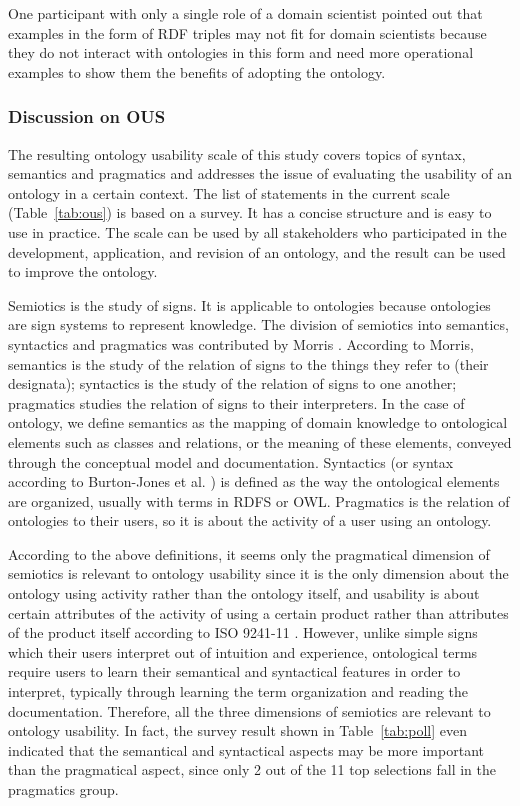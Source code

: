 One participant with only a single role of a domain scientist pointed out that examples in the form of RDF triples may not fit for domain scientists because they do not interact with ontologies in this form and need more operational examples to show them the benefits of adopting the ontology.

\subsubsection{Discussion on OUS}
The resulting ontology usability scale of this study covers topics of syntax, semantics and pragmatics and addresses the issue of evaluating the usability of an ontology in a certain context. The list of statements in the current scale (Table~\ref{tab:ous}) is based on a survey. It has a concise structure and is easy to use in practice. The scale can be used by all stakeholders who participated in the development, application, and revision of an ontology, and the result can be used to improve the ontology.

Semiotics is the study of signs. It is applicable to ontologies because ontologies are sign systems to represent knowledge. The division of semiotics into semantics, syntactics and pragmatics was contributed by Morris \cite{morris1938foundations}. According to Morris, semantics is the study of the relation of signs to the things they refer to (their designata); syntactics is the study of the relation of signs to one another; pragmatics studies the relation of signs to their interpreters. In the case of ontology, we define semantics as the mapping of domain knowledge to ontological elements such as classes and relations, or the meaning of these elements, conveyed through the conceptual model and documentation. Syntactics (or syntax according to Burton-Jones et al. \cite{burton2005semiotic}) is defined as the way the ontological elements are organized, usually with terms in RDFS or OWL. Pragmatics is the relation of ontologies to their users, so it is about the activity of a user using an ontology.

According to the above definitions, it seems only the pragmatical dimension of semiotics is relevant to ontology usability since it is the only dimension about the ontology using activity rather than the ontology itself, and usability is about certain attributes of the activity of using a certain product rather than attributes of the product itself according to ISO 9241-11 \cite{iso19989241}. However, unlike simple signs which their users interpret out of intuition and experience, ontological terms require users to learn their semantical and syntactical features in order to interpret, typically through learning the term organization and reading the documentation. Therefore, all the three dimensions of semiotics are relevant to ontology usability. In fact, the survey result shown in Table~\ref{tab:poll} even indicated that the semantical and syntactical aspects may be more important than the pragmatical aspect, since only 2 out of the 11 top selections fall in the pragmatics group.

